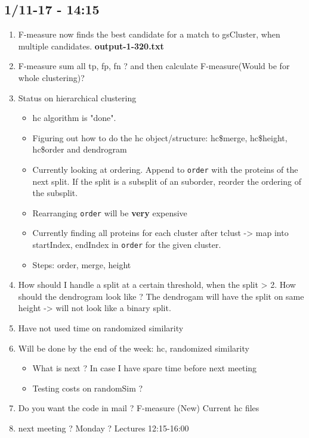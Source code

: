 \documentclass[a4paper,10pt]{article}
\begin{document}
\subsection{1/11-17 - 14:15}

\begin{enumerate}
	\item F-measure now finds the best candidate for a match to gsCluster, when multiple candidates. \textbf{output-1-320.txt}
	
	\item F-measure sum all tp, fp, fn ? and then calculate F-measure(Would be for whole clustering)?
	
	\item Status on hierarchical clustering
	\begin{itemize}
		\item hc algorithm is "done".
		\item Figuring out how to do the hc object/structure: hc\$merge, hc\$height, hc\$order and dendrogram
		\item Currently looking at ordering. Append to \texttt{order} with the proteins of the next split. If the split is a subsplit of an suborder, reorder the ordering of the subsplit.
		\item Rearranging \texttt{order} will be \textbf{very} expensive
		\item Currently finding all proteins for each cluster after tclust -> map into startIndex, endIndex in \texttt{order} for the given cluster.
		\item Steps: order, merge, height
	\end{itemize}
	
	\item How should I handle a split at a certain threshold, when the split > 2. How should the dendrogram look like ?
	The dendrogam will have the split on same height -> will not look like a binary split.
	
	\item Have not used time on randomized similarity
	
	\item Will be done by the end of the week: hc, randomized similarity
	\begin{itemize}
		\item What is next ? In case I have spare time before next meeting
		\item Testing costs on randomSim ?
	\end{itemize}
	
	
	\item Do you want the code in mail ?
	\subitem F-measure (New)
	\subitem Current hc files
	
	\item next meeting ? Monday ? Lectures 12:15-16:00
\end{enumerate}
\end{document}
